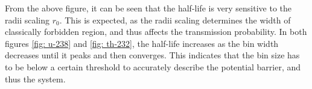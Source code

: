 \documentclass[a4paper]{article}
\begin{document}
\begin{comment}
As from the above figure, it can be seen that the half-life is very sensitive to the radii scaling $r_0$.
In both \ref{fig: u-238} -- \ref{fig: th-232} the half life increases as the number of bins increases, until it peaks and then converges.
This is due to the discretization of the potential barrier, where the potential is constant in each region, with increasing number of bins, the potential is more accurately described;
with a better description of the potential, the system is more accurately described.
\end{comment}
From the above figure, it can be seen that the half-life is very sensitive to the radii scaling $r_0$.
This is expected, as the radii scaling determines the width of classically forbidden region, and thus affects the transmission probability.
In both figures \ref{fig: u-238} and \ref{fig: th-232}, the half-life increases as the bin width decreases until it peaks and then converges.
This indicates that the bin size has to be below a certain threshold to accurately describe the potential barrier, and thus the system.
\end{document}
